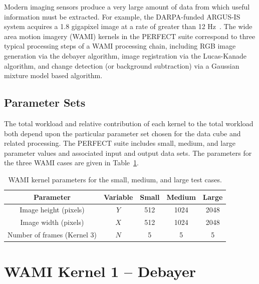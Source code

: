 \documentclass{report}
\begin{document}
Modern imaging sensors produce a very large amount of data from which useful
information must be extracted.
For example, the DARPA-funded ARGUS-IS system acquires a
1.8 gigapixel image at a rate of greater than 12 Hz~\cite{ARGUS-IS}.
The wide area motion imagery (WAMI) kernels in the PERFECT suite
correspond to three typical processing steps of a WAMI processing
chain, including RGB image generation via the debayer algorithm,
image registration via the Lucas-Kanade algorithm, and change
detection (or background subtraction) via a Gaussian mixture model
based algorithm.

\subsection{Parameter Sets}

The total workload and relative contribution of each kernel to the total
workload both depend upon the particular parameter set chosen for
the data cube and related processing.
The PERFECT suite includes small, medium, and large parameter values and
associated input and output data sets.
The parameters for the three WAMI cases are given in Table~\ref{tbl:wami:params}.

\begin{table}[t]
    \begin{center}
    \caption{WAMI kernel parameters for the small, medium, and large test cases.}
    \begin{tabular}{|c|c|c|c|c|}
        \hline
        Parameter & Variable & Small & Medium & Large \\ \hline
        Image height (pixels) & $Y$ & 512 & 1024 & 2048 \\ \hline
        Image width (pixels) & $X$ & 512 & 1024 & 2048 \\ \hline
        Number of frames (Kernel 3) & $N$ & 5 & 5 & 5 \\ \hline
    \end{tabular}
    \label{tbl:wami:params}
    \end{center}
\end{table}



\section{WAMI Kernel 1 -- Debayer}
\end{document}
